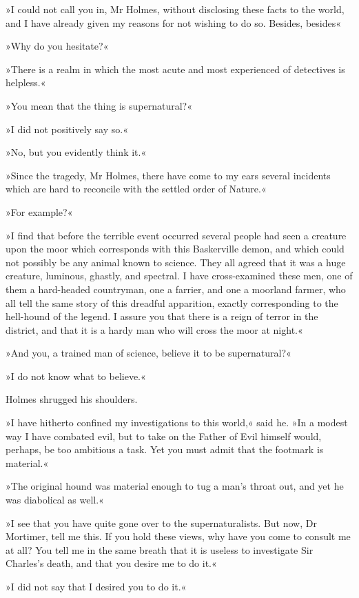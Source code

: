 »I could not call you in, Mr Holmes, without disclosing these facts to the world, and I have already given my reasons for not wishing to do so. Besides, besides\longdash«

»Why do you hesitate?«

»There is a realm in which the most acute and most experienced of detectives is helpless.«

»You mean that the thing is supernatural?«

»I did not positively say so.«

»No, but you evidently think it.«

»Since the tragedy, Mr Holmes, there have come to my ears several incidents which are hard to reconcile with the settled order of Nature.«

»For example?«

»I find that before the terrible event occurred several people had seen a creature upon the moor which corresponds with this Baskerville demon, and which could not possibly be any animal known to science. They all agreed that it was a huge creature, luminous, ghastly, and spectral. I have cross-examined these men, one of them a hard-headed countryman, one a farrier, and one a moorland farmer, who all tell the same story of this dreadful apparition, exactly corresponding to the hell-hound of the legend. I assure you that there is a reign of terror in the district, and that it is a hardy man who will cross the moor at night.«

»And you, a trained man of science, believe it to be supernatural?«

»I do not know what to believe.«

Holmes shrugged his shoulders.

»I have hitherto confined my investigations to this world,« said he. »In a modest way I have combated evil, but to take on the Father of Evil himself would, perhaps, be too ambitious a task. Yet you must admit that the footmark is material.«

»The original hound was material enough to tug a man's throat out, and yet he was diabolical as well.«

»I see that you have quite gone over to the supernaturalists. But now, Dr Mortimer, tell me this. If you hold these views, why have you come to consult me at all? You tell me in the same breath that it is useless to investigate Sir Charles's death, and that you desire me to do it.«

»I did not say that I desired you to do it.«

